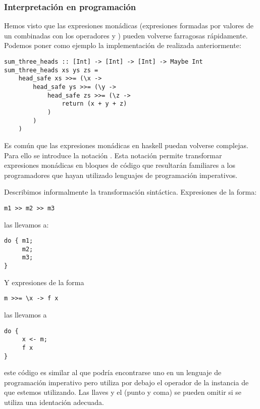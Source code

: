 \subsubsection{Interpretación en programación}
Hemos visto que las expresiones monádicas (expresiones formadas
por valores de un  combinadas con los operadores
 y \cod{>{}>=}) pueden volverse farragosas rápidamente.
Podemos poner como ejemplo la implementación de
 realizada anteriormente:
\begin{verbatim}
sum_three_heads :: [Int] -> [Int] -> [Int] -> Maybe Int
sum_three_heads xs ys zs =
    head_safe xs >>= (\x ->
        head_safe ys >>= (\y ->
            head_safe zs >>= (\z ->
                return (x + y + z)
            )
        )
    )
\end{verbatim}
Es común que las expresiones monádicas en haskell puedan volverse
complejas. Para ello se introduce la notación .
Esta notación permite transformar expresiones monádicas en bloques
de código que resultarán familiares a los programadores que hayan
utilizado lenguajes de programación imperativos.

Describimos informalmente la transformación sintáctica. Expresiones
de la forma:
\begin{verbatim}
m1 >> m2 >> m3
\end{verbatim}
las llevamos a:
\begin{verbatim}
do { m1;
     m2;
     m3;
}
\end{verbatim}
Y expresiones de la forma
\begin{verbatim}
m >>= \x -> f x
\end{verbatim}
las llevamos a
\begin{verbatim}
do {
     x <- m;
     f x
}
\end{verbatim}
este código es similar al que podría encontrarse uno en un lenguaje
de programación imperativo pero utiliza por debajo el operador
\cod{>{}>=} de la instancia de  que estemos utilizando.
Las llaves y el \cod{;} (punto y coma) se pueden omitir si se utiliza
una identación adecuada.

